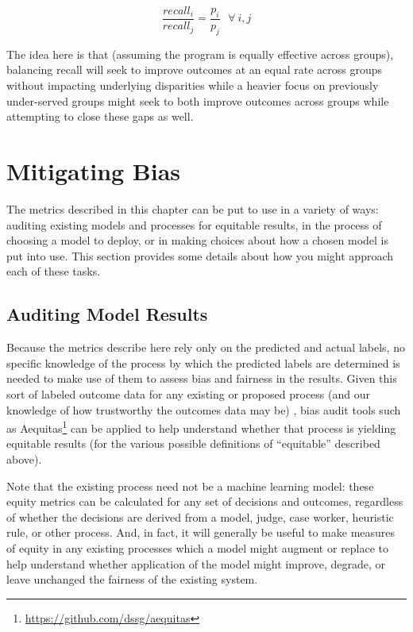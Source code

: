 \documentclass[]{krantz}
\begin{document}
\[\frac{recall_i}{recall_j} = \frac{p_i}{p_j}~~~\forall~i,j\]

The idea here is that (assuming the program is equally effective across
groups), balancing recall will seek to improve outcomes at an equal rate
across groups without impacting underlying disparities while a heavier
focus on previously under-served groups might seek to both improve
outcomes across groups while attempting to close these gaps as well.

\hypertarget{sec:applications}{\section{Mitigating
Bias}\label{sec:applications}}

The metrics described in this chapter can be put to use in a variety of
ways: auditing existing models and processes for equitable results, in
the process of choosing a model to deploy, or in making choices about
how a chosen model is put into use. This section provides some details
about how you might approach each of these tasks.

\subsection{Auditing Model Results}\label{auditing-model-results}

Because the metrics describe here rely only on the predicted and actual
labels, no specific knowledge of the process by which the predicted
labels are determined is needed to make use of them to assess bias and
fairness in the results. Given this sort of labeled outcome data for any
existing or proposed process (and our knowledge of how trustworthy the
outcomes data may be) , bias audit tools such as Aequitas\footnote{\url{https://github.com/dssg/aequitas}}
can be applied to help understand whether that process is yielding
equitable results (for the various possible definitions of ``equitable''
described above).

Note that the existing process need not be a machine learning model:
these equity metrics can be calculated for any set of decisions and
outcomes, regardless of whether the decisions are derived from a model,
judge, case worker, heuristic rule, or other process. And, in fact, it
will generally be useful to make measures of equity in any existing
processes which a model might augment or replace to help understand
whether application of the model might improve, degrade, or leave
unchanged the fairness of the existing system.
\end{document}
